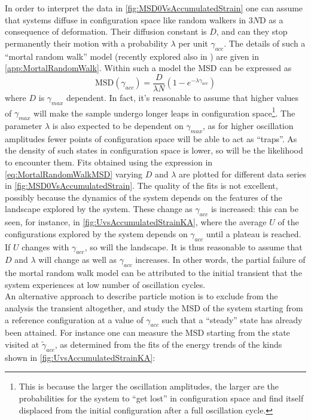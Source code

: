 In order to interpret the data in \autoref{fig:MSD0VsAccumulatedStrain} one can assume that systems diffuse in configuration space like random walkers in $3N$D as a consequence of deformation. Their diffusion constant is $D$, and can they stop permanently their motion with a probability $\lambda$ per unit $\gamma_{acc}$. The details of such a ``mortal random walk'' model (recently explored also in \cite{yuste2013exploration}) are given in \autoref{app:MortalRandomWalk}. Within such a model the MSD can be expressed as 
\begin{equation}
	\text{MSD} (\gamma_{acc}) =  \frac{D}{\lambda N} (1 - e^{-\lambda \gamma_{acc}})
	\label{eq:MortalRandomWalkMSD}
\end{equation} 
where $D$ is $\gamma_{max}$ dependent. In fact, it's reasonable to assume that higher values of $\gamma_{max}$ will make the sample undergo longer leaps in configuration space\footnote{This is because the larger the oscillation amplitudes, the larger are the probabilities for the system to ``get lost'' in configuration space and find itself displaced from the initial configuration after a full oscillation cycle.}. The parameter $\lambda$ is also expected to be dependent on $\gamma_{max}$, as for higher oscillation amplitudes fewer points of configuration space will be able to act as ``traps''. As the density of such states in configuration space is lower, so will be the likelihood to encounter them.
Fits obtained using the expression in \autoref{eq:MortalRandomWalkMSD} varying $D$ and $\lambda$ are plotted for different data series in \autoref{fig:MSD0VsAccumulatedStrain}. The quality of the fits is not excellent, possibly because the dynamics of the system depends on the features of the landscape explored by the system. These change as $\gamma_{acc}$ is increased: this can be seen, for instance, in \autoref{fig:UvsAccumulatedStrainKA}, where the average $U$ of the configurations explored by the system depends on $\gamma_{acc}$ until a plateau is reached. If $U$ changes with $\gamma_{acc}$, so will the landscape. It is thus reasonable to assume that $D$ and $\lambda$ will change as well as $\gamma_{acc}$ increases.
In other words, the partial failure of the mortal random walk model can be attributed to the initial transient that the system experiences at low number of oscillation cycles. \\
An alternative approach to describe particle motion is to exclude from the analysis the transient altogether, and study the MSD of the system starting from a reference configuration at a value of $\gamma_{acc}$ such that a ``steady'' state has already been attained. For instance one can measure the MSD starting from the state visited at $\widetilde{\gamma}_{acc}$, as determined from the fits of the energy trends of the kinds shown in \autoref{fig:UvsAccumulatedStrainKA}:

